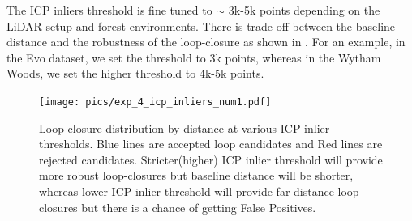 The ICP inliers threshold is fine tuned to $\sim$ 3k-5k points depending on the LiDAR setup and forest environments. There is trade-off between the baseline distance and the robustness of the loop-closure as shown in . For an example, in the Evo dataset, we set the threshold to 3k points, whereas in the Wytham Woods, we set the higher threshold to 4k-5k points. 
 \begin{figure}[t]
  \centering
  \texttt{[image: pics/exp\_4\_icp\_inliers\_num1.pdf]}
  \caption{Loop closure distribution by distance at various ICP inlier thresholds. Blue lines are accepted loop candidates and Red lines are rejected candidates. Stricter(higher) ICP inlier threshold will provide more robust loop-closures but baseline distance will be shorter, whereas lower ICP inlier threshold will provide far distance loop-closures but there is a chance of getting False Positives.}
  \label{fig:icp_inliers_num}
\end{figure}

